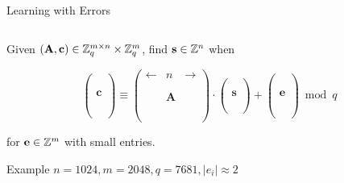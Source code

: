 \documentclass[xcolor=table,10pt,aspectratio=169]{beamer}
\renewcommand{\vec}[1]{\ensuremath{\mathbf{#1}}\xspace}
\providecommand{\mat}[1]{\ensuremath{\vec{#1}}\xspace}
\begin{document}
\begin{frame}[label={sec:org9e56893}]{Learning with Errors}
\begin{columns}
\begin{column}[t]{0.6\columnwidth}
Given \((\mat{A},\vec{c}) \in \ZZ_{q}^{m \times n} \times \ZZ_{q}^{m}\), find \(\vec{s}  \in \ZZ^{n}\) when

\[
\left(\begin{array}{c} \\ \\ \\ \vec{c}\\ \\ \\ \\ \end{array} \right)
\equiv \left(\begin{array}{ccc}
\leftarrow & n & \rightarrow \\ \\ \\ 
& \mathbf{A} & \\
\\ \\ \\
\end{array} \right)
\cdot \left(\begin{array}{c} \\ \\ \vec{s}\\ \\ \\ \end{array} \right)
+ \left(\begin{array}{c} \\ \\ \\ \vec{e}\\ \\ \\ \\\end{array}\right)
\bmod q
\]

for \(\vec{e} \in \ZZ^{m}\) with small entries.

\begin{alertblock}{Example}
\(n = 1024, m=2048, q=7681, |e_{i}| \approx 2\)
\end{alertblock}
\end{column}


\end{columns}
\end{frame}
\end{document}
